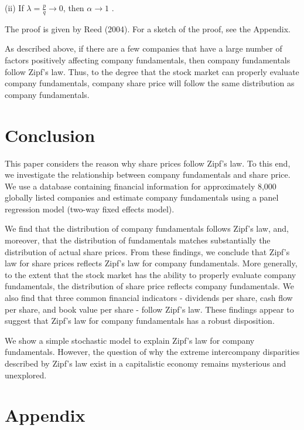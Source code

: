 \documentclass[10pt,a4paper]{article}
\begin{document}
 (ii) If  $\lambda=\frac{p}{q} \to 0$, then $\alpha \to 1$ . 

The proof is given by Reed (2004). For a sketch of the proof, see the Appendix. 

As described above, if there are a few companies that have a large number of factors positively affecting company fundamentals, then company fundamentals follow Zipf's law. Thus, to the degree that the stock market can properly evaluate company fundamentals, company share price will follow the same distribution as company fundamentals. 

\section{Conclusion}
This paper considers the reason why share prices follow Zipf's law. To this end, we investigate the relationship between company fundamentals and share price. We use a database containing financial information for approximately 8,000 globally listed companies and estimate company fundamentals using a panel regression model (two-way fixed effects model).
 
We find that the distribution of company fundamentals follows Zipf's law, and, moreover, that the distribution of fundamentals matches substantially the distribution of actual share prices. From these findings, we conclude that Zipf's law for share prices reflects Zipf's law for company fundamentals. More generally, to the extent that the stock market has the ability to properly evaluate company fundamentals, the distribution of share price reflects company fundamentals. We also find that three common financial indicators - dividends per share, cash flow per share, and book value per share - follow Zipf's law. These findings appear to suggest that Zipf's law for company fundamentals has a robust disposition.
 
We show a simple stochastic model to explain Zipf's law for company fundamentals. However, the question of why the extreme intercompany disparities described by Zipf's law exist in a capitalistic economy remains mysterious and unexplored.

\section*{Appendix}
\end{document}
